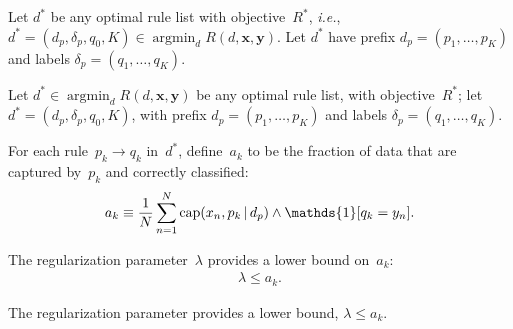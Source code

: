 \documentclass[twoside,11pt]{article}
\def\ie{{\it i.e.},~}
\def\one{\mathds{1}}
\newcommand{\x}{\mathbf{x}}
\newcommand{\y}{\mathbf{y}}
\def\RL{{d}}
\def\Prefix{d_p}
\def\Labels{\delta_p}
\def\Default{q_0}
\def\Obj{R}
\def\Reg{{\lambda}}
\def\Cap{\textnormal{cap}}
\def\OptimalObj{R^*}
\def\OptimalRL{d^*}
\DeclareMathOperator*{\argmin}{argmin}
\def\one{\mathds{1}}
\newcommand{\given}{\,|\,}
\begin{document}
\begin{theorem}
\label{thm:min-capture-correct}
\begin{arxiv}
Let ${\OptimalRL}$
be any optimal rule list with objective~$\OptimalObj$, \ie
${\OptimalRL = (\Prefix, \Labels, \Default, K) \in \argmin_\RL \Obj(\RL, \x, \y)}$.
%
Let $\OptimalRL$ have prefix ${\Prefix = (p_1, \dots, p_K)}$
and labels ${\Labels = (q_1, \dots, q_K)}$.
\end{arxiv}
\begin{kdd}
Let ${\OptimalRL \in \argmin_\RL \Obj(\RL, \x, \y)}$
be any optimal rule list, with objective~$\OptimalObj$;
let ${\OptimalRL = (\Prefix, \Labels, \Default, K)}$,
with prefix ${\Prefix = (p_1, \dots, p_K)}$
and labels ${\Labels = (q_1, \dots, q_K)}$.
\end{kdd}
%
For each rule~${p_k \rightarrow q_k}$ in~$\OptimalRL$,
define~$a_k$ to be the fraction of data that are captured by~$p_k$
and correctly classified:
\begin{align}
a_k \equiv \frac{1}{N} \sum_{n=1}^N
  \Cap(x_n, p_k \given \Prefix) \wedge \one [ q_k = y_n ].
\label{eq:rule-correct}
\end{align}
\begin{arxiv}
The regularization parameter~$\Reg$ provides a lower bound on~$a_k$:
\begin{align}
\Reg \le a_k.
\label{eq:min-capture-correct}
\end{align}
\end{arxiv}
\begin{kdd}
The regularization parameter provides a lower bound, $\Reg \le a_k$.
\end{kdd}
\end{theorem}
\end{document}
